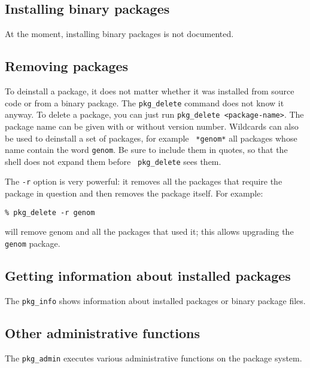 

\subsection{Installing binary packages} %

At the moment, installing binary packages is not documented.


\subsection{Removing packages} %

To deinstall a package, it does not matter whether it was installed from source
code or from a binary package.  The {\tt pkg\_delete} command  does not know it
anyway.     To  delete   a  package,   you   can  just   run  {\tt  pkg\_delete
<package-name>}.  The package name can be given with or without version number.
Wildcards  can also be used  to deinstall a  set of  packages, for example {\tt
*genom*}  all packages whose name   contain the word  {\tt  genom}.  Be sure to
include them in quotes,  so that the  shell  does not  expand them  before {\tt
pkg\_delete} sees them.

The {\tt -r} option is very powerful: it  removes all the packages that require
the package in question and then removes the package itself. For example:

\begin{verbatim}
% pkg_delete -r genom
\end{verbatim}

will remove genom and all the packages that used it; this allows
upgrading the {\tt genom} package.


\subsection{Getting information about installed packages} %

The {\tt pkg\_info} shows   information  about  installed packages or    binary
package files.


\subsection{Other administrative functions} %

The {\tt pkg\_admin} executes various  administrative functions on the  package
system.
